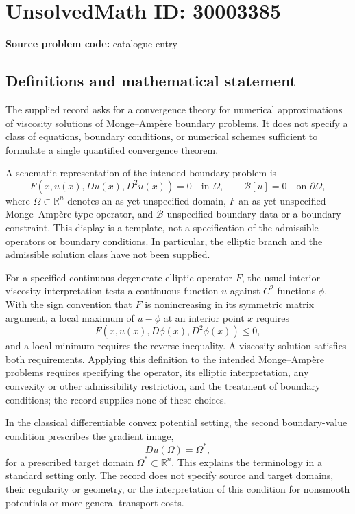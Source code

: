 \documentclass[11pt]{article}
\newcommand{\R}{\mathbb{R}}
\begin{document}
\section*{UnsolvedMath ID: 30003385}
\textbf{Source problem code:} catalogue entry
\subsection{Definitions and mathematical statement}
The supplied record asks for a convergence theory for numerical approximations of viscosity solutions of Monge--Amp\`ere boundary problems. It does not specify a class of equations, boundary conditions, or numerical schemes sufficient to formulate a single quantified convergence theorem.

A schematic representation of the intended boundary problem is
\[
F(x,u(x),Du(x),D^2u(x))=0\quad\text{in }\Omega,
\qquad \mathcal B[u]=0\quad\text{on }\partial\Omega,
\]
where \(\Omega\subset\R^n\) denotes an as yet unspecified domain, \(F\) an as yet unspecified Monge--Amp\`ere type operator, and \(\mathcal B\) unspecified boundary data or a boundary constraint. This display is a template, not a specification of the admissible operators or boundary conditions. In particular, the elliptic branch and the admissible solution class have not been supplied.

For a specified continuous degenerate elliptic operator \(F\), the usual interior viscosity interpretation tests a continuous function \(u\) against \(C^2\) functions \(\phi\). With the sign convention that \(F\) is nonincreasing in its symmetric matrix argument, a local maximum of \(u-\phi\) at an interior point \(x\) requires
\[
F(x,u(x),D\phi(x),D^2\phi(x))\leq 0,
\]
and a local minimum requires the reverse inequality. A viscosity solution satisfies both requirements. Applying this definition to the intended Monge--Amp\`ere problems requires specifying the operator, its elliptic interpretation, any convexity or other admissibility restriction, and the treatment of boundary conditions; the record supplies none of these choices.

In the classical differentiable convex potential setting, the second boundary-value condition prescribes the gradient image,
\[
Du(\Omega)=\Omega^*,
\]
for a prescribed target domain \(\Omega^*\subset\R^n\). This explains the terminology in a standard setting only. The record does not specify source and target domains, their regularity or geometry, or the interpretation of this condition for nonsmooth potentials or more general transport costs.
\end{document}
